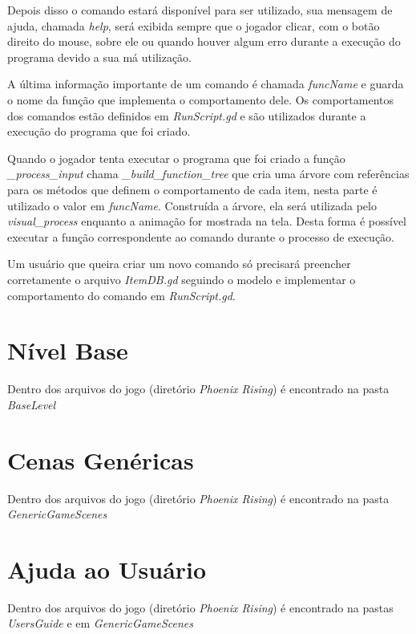 Depois disso o comando estará disponível para ser utilizado, sua
mensagem de ajuda, chamada \textit{help}, será exibida sempre que o jogador 
clicar, com o botão direito do mouse, sobre ele ou quando houver algum 
erro durante a execução do programa devido a sua má utilização.

A última informação importante de um comando é chamada \textit{funcName} e 
guarda o nome da função que implementa o comportamento dele. Os comportamentos
dos comandos estão definidos em \textit{RunScript.gd} e são utilizados durante
a execução do programa que foi criado.

Quando o jogador tenta executar o programa que foi criado a função 
\textit{\_process\_input} chama \textit{\_build\_function\_tree} que 
cria uma árvore com referências para os métodos que definem o comportamento de 
cada item, nesta parte é utilizado o valor em \textit{funcName}. Construída a 
árvore, ela será utilizada pelo \textit{visual\_process} enquanto a animação 
for mostrada na tela. Desta forma é possível executar a função correspondente ao 
comando durante o processo de execução.

Um usuário que queira criar um novo comando só precisará preencher corretamente 
o arquivo \textit{ItemDB.gd} seguindo o modelo e
implementar o comportamento do comando em \textit{RunScript.gd}.


\section{Nível Base}

Dentro dos arquivos do jogo (diretório \textit{Phoenix Rising}) é encontrado na
pasta \textit{BaseLevel}

\section{Cenas Genéricas}

Dentro dos arquivos do jogo (diretório \textit{Phoenix Rising}) é encontrado na
pasta \textit{GenericGameScenes}

\section{Ajuda ao Usuário}

Dentro dos arquivos do jogo (diretório \textit{Phoenix Rising}) é encontrado na
pastas \textit{UsersGuide} e em \textit{GenericGameScenes} 



